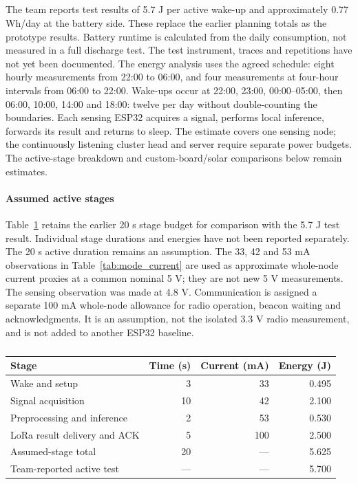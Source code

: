 \subsection{}
\label{sec:estimated_power_budget}
\begingroup\color{black}
The team reports test results of 5.7 J per active wake-up and approximately 0.77 Wh/day at the battery side. These replace the earlier planning totals as the prototype results. Battery runtime is calculated from the daily consumption, not measured in a full discharge test. The test instrument, traces and repetitions have not yet been documented. The energy analysis uses the agreed schedule: eight hourly measurements from 22:00 to 06:00, and four measurements at four-hour intervals from 06:00 to 22:00. Wake-ups occur at 22:00, 23:00, 00:00--05:00, then 06:00, 10:00, 14:00 and 18:00: twelve per day without double-counting the boundaries. Each sensing ESP32 acquires a signal, performs local inference, forwards its result and returns to sleep. The estimate covers one sensing node; the continuously listening cluster head and server require separate power budgets. The active-stage breakdown and custom-board/solar comparisons below remain estimates.

\paragraph{Assumed active stages}
Table~\ref{tab:assumed_active_stages} retains the earlier 20 s stage budget for comparison with the 5.7 J test result. Individual stage durations and energies have not been reported separately. The 20 s active duration remains an assumption. The 33, 42 and 53 mA observations in Table~\ref{tab:mode_current} are used as approximate whole-node current proxies at a common nominal 5 V; they are not new 5 V measurements. The sensing observation was made at 4.8 V. Communication is assigned a separate 100 mA whole-node allowance for radio operation, beacon waiting and acknowledgments. It is an assumption, not the isolated 3.3 V radio measurement, and is not added to another ESP32 baseline.

\begin{table}[htbp]
\centering\small\color{black}
\caption{}
\label{tab:assumed_active_stages}
\begin{tabular}{lrrr}
\toprule
Stage & Time (s) & Current (mA) & Energy (J) \\
\midrule
Wake and setup & 3 & 33 & 0.495 \\
Signal acquisition & 10 & 42 & 2.100 \\
Preprocessing and inference & 2 & 53 & 0.530 \\
LoRa result delivery and ACK & 5 & 100 & 2.500 \\
\midrule
Assumed-stage total & 20 & --- & 5.625 \\
Team-reported active test & --- & --- & 5.700 \\
\bottomrule
\end{tabular}
\end{table}
\FloatBarrier


